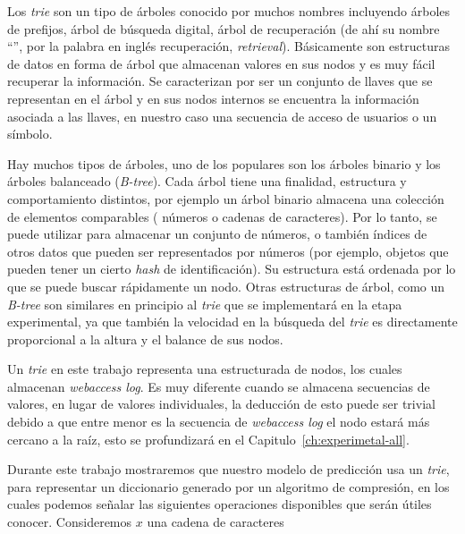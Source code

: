 
Los \emph{trie} son un tipo de árboles conocido por muchos nombres incluyendo árboles de prefijos, árbol de búsqueda digital, árbol de recuperación (de ahí su nombre ``\trie'', por la palabra en inglés recuperación, \emph{retrieval}). Básicamente son estructuras de datos en forma de árbol que almacenan valores en sus nodos y es muy fácil recuperar la información. Se caracterizan por ser un conjunto de llaves que se representan en el árbol y en sus nodos internos se encuentra la información asociada a las llaves, en nuestro caso una secuencia de acceso de usuarios o un símbolo. 

Hay muchos tipos de árboles, uno de los populares son los árboles binario y los árboles balanceado (\emph{B-tree}). Cada árbol tiene una finalidad, estructura y comportamiento distintos, por ejemplo un árbol binario almacena una colección de elementos comparables ( números o cadenas de caracteres). Por lo tanto, se puede utilizar para almacenar un conjunto de números, o también  índices de otros datos que pueden ser representados por números (por ejemplo, objetos que pueden tener un cierto \emph{hash} de identificación). Su estructura está ordenada por lo que se puede buscar rápidamente un nodo. Otras estructuras de árbol, como un \emph{B-tree} son similares en principio al \emph{trie} que se implementará en la etapa experimental, ya que también la velocidad en la búsqueda del \emph{trie} es directamente proporcional a la altura y el balance de sus nodos.

Un \emph{trie} en este trabajo representa una estructurada de nodos, los cuales almacenan \emph{webaccess log}.  Es muy diferente cuando se almacena secuencias de valores, en lugar de valores individuales, la deducción de esto puede ser trivial debido a que entre menor es la secuencia de \emph{webaccess log} el nodo estará más cercano a la raíz, esto se profundizará en el Capitulo~\ref{ch:experimetal-all}. %


Durante este trabajo mostraremos que nuestro modelo de predicción usa un \emph{trie}, para representar un diccionario generado por un algoritmo de compresión, en los cuales podemos señalar las siguientes operaciones disponibles que serán útiles conocer. Consideremos $x$ una cadena de caracteres

